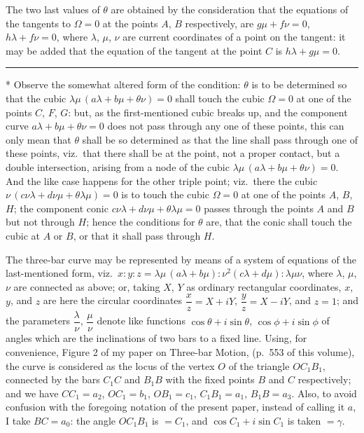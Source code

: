 \documentclass[11pt,a4paper]{book}
\begin{document}
The two last values of $\theta$ are obtained by the consideration that the equations of the tangents to $\Omega=0$ at the points $A$, $B$ respectively, are $g\mu+f\nu=0$, $h\lambda+f\nu=0$, where $\lambda$, $\mu$, $\nu$ are current coordinates of a point on the tangent: it may be added that the equation of the tangent at the point $C$ is $h\lambda+g\mu=0$.

\vspace{1ex}
\noindent\rule{2em}{0.4pt}
\begin{flushleft}
\small
* Observe the somewhat altered form of the condition: $\theta$ is to be determined so that the cubic $\lambda\mu\,(a\lambda+b\mu+\theta\nu)=0$ shall touch the cubic $\Omega=0$ at one of the points $C$, $F$, $G$: but, as the first-mentioned cubic breaks up, and the component curve $a\lambda+b\mu+\theta\nu=0$ does not pass through any one of these points, this can only mean that $\theta$ shall be so determined as that the line shall pass through one of these points, viz.\ that there shall be at the point, not a proper contact, but a double intersection, arising from a node of the cubic $\lambda\mu\,(a\lambda+b\mu+\theta\nu)=0$. And the like case happens for the other triple point; viz.\ there the cubic $\nu\,(c\nu\lambda+d\nu\mu+\theta\lambda\mu)=0$ is to touch the cubic $\Omega=0$ at one of the points $A$, $B$, $H$; the component conic $c\nu\lambda+d\nu\mu+\theta\lambda\mu=0$ passes through the points $A$ and $B$ but not through $H$; hence the conditions for $\theta$ are, that the conic shall touch the cubic at $A$ or $B$, or that it shall pass through $H$.
\end{flushleft}

\newpage

\noindent
The three-bar curve may be represented by means of a system of equations of the last-mentioned form, viz.\ $x:y:z = \lambda\mu\,(a\lambda+b\mu) : \nu^2(c\lambda+d\mu) : \lambda\mu\nu$, where $\lambda$, $\mu$, $\nu$ are connected as above; or, taking $X$, $Y$ as ordinary rectangular coordinates, $x$, $y$, and $z$ are here the circular coordinates $\dfrac{x}{z} = X+iY$, $\dfrac{y}{z} = X-iY$, and $z=1$; and the parameters $\dfrac{\lambda}{\nu}$, $\dfrac{\mu}{\nu}$ denote like functions $\cos\theta+i\sin\theta$, $\cos\phi+i\sin\phi$ of angles which are the inclinations of two bars to a fixed line. Using, for convenience, Figure 2 of my paper on Three-bar Motion, (p.~553 of this volume), the curve is considered as the locus of the vertex $O$ of the triangle $OC_1B_1$, connected by the bars $C_1C$ and $B_1B$ with the fixed points $B$ and $C$ respectively; and we have $CC_1=a_2$, $OC_1=b_1$, $OB_1=c_1$, $C_1B_1=a_1$, $B_1B=a_3$. Also, to avoid confusion with the foregoing notation of the present paper, instead of calling it $a$, I take $BC=a_0$: the angle $OC_1B_1$ is $=C_1$, and $\cos C_1+i\sin C_1$ is taken $=\gamma$.
\end{document}
